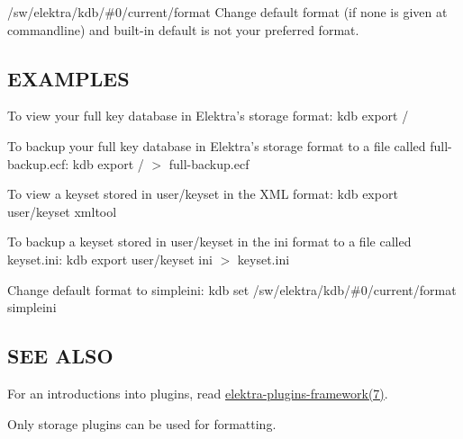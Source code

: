 \begin{DoxyItemize}
\item {\ttfamily /sw/elektra/kdb/\#0/current/format} Change default format (if none is given at commandline) and built-\/in default is not your preferred format.
\end{DoxyItemize}

\subsection*{E\+X\+A\+M\+P\+L\+E\+S}

To view your full key database in Elektra's {\ttfamily storage} format\+: {\ttfamily kdb export /}

To backup your full key database in Elektra's {\ttfamily storage} format to a file called {\ttfamily full-\/backup.\+ecf}\+: {\ttfamily kdb export / $>$ full-\/backup.\+ecf}

To view a keyset stored in {\ttfamily user/keyset} in the X\+M\+L format\+: {\ttfamily kdb export user/keyset xmltool}

To backup a keyset stored in {\ttfamily user/keyset} in the {\ttfamily ini} format to a file called {\ttfamily keyset.\+ini}\+: {\ttfamily kdb export user/keyset ini $>$ keyset.\+ini}

Change default format to {\ttfamily simpleini}\+: {\ttfamily kdb set /sw/elektra/kdb/\#0/current/format simpleini}

\subsection*{S\+E\+E A\+L\+S\+O}


\begin{DoxyItemize}
\item For an introductions into plugins, read \hyperlink{md_doc_help_elektra-plugins-framework_doc_help_elektra-plugins-framework_md}{elektra-\/plugins-\/framework(7)}.
\item Only storage plugins can be used for formatting. 
\end{DoxyItemize}